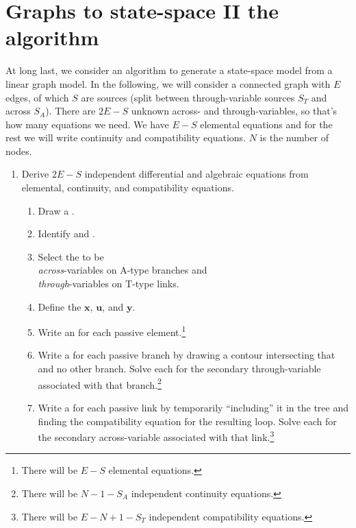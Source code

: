 \documentclass[dynamic_systems.tex]{subfiles}
\begin{document}
\section{Graphs to state-space II the algorithm}
\tags{}
\label{lec:graphs2}

At long last, we consider an algorithm to generate a state-space model from a linear graph model.
In the following, we will consider a connected graph with $E$ edges, of which $S$ are sources (split between through-variable sources $S_T$ and across $S_A$).
There are $2 E - S$ unknown across- and through-variables, so that's how many equations we need.
We have $E-S$ elemental equations and for the rest we will write continuity and compatibility equations.
$N$ is the number of nodes.

\begin{enumerate}
	\item Derive $2 E-S$ independent differential and algebraic equations from elemental, continuity, and compatibility equations.
	\begin{enumerate}
		\item Draw a .
		\item Identify  and .
		\item Select the  to be\\ 
		\emph{across}-variables on A-type branches and \\
		\emph{through}-variables on T-type links.
		\item Define the  $\bm{x}$,  $\bm{u}$, and  $\bm{y}$.
		\item Write an  for each passive element.\footnote{There will be $E-S$ elemental equations.}
		\item Write a  for each passive branch by drawing a contour intersecting that and no other branch.
		Solve each for the secondary through-variable associated with that branch.\footnote{There will be $N - 1 - S_A$ independent continuity equations.}
		\item Write a  for each passive link by temporarily ``including'' it in the tree and finding the compatibility equation for the resulting loop.
		Solve each for the secondary across-variable associated with that link.\footnote{There will be $E-N+1-S_T$ independent compatibility equations.}
	\end{enumerate}

\end{enumerate}
\end{document}
